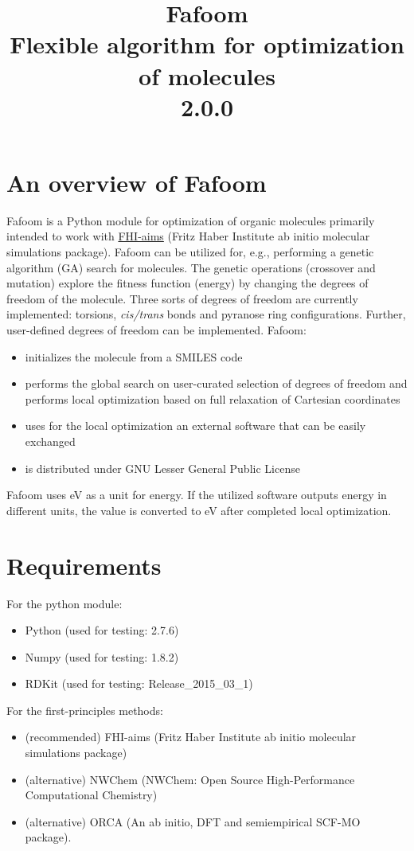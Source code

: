 \documentclass[a4paper]{article}
\title{\textbf{Fafoom}\\Flexible algorithm for optimization of molecules \\ 2.0.0}
\begin{document}
\maketitle

\tableofcontents
\newpage

\section{An overview of Fafoom}

Fafoom is a Python module for optimization of organic molecules primarily intended to work with \href{https://doi.org/10.1021/acs.jcim.5b00243}{FHI-aims} (Fritz Haber Institute ab initio molecular simulations package). 
Fafoom can be utilized for, e.g., performing  a genetic algorithm (GA) search for molecules. The genetic operations (crossover and mutation) explore the fitness function (energy) by changing the degrees of freedom of the molecule. Three sorts of degrees of freedom are currently implemented: torsions, \textit{cis/trans} bonds and pyranose ring configurations. Further, user-defined degrees of freedom can be implemented. Fafoom:
\begin{itemize}
\item initializes the molecule from a SMILES code
\item performs the global search on user-curated selection of degrees of freedom and performs local optimization based on full relaxation of Cartesian coordinates
\item uses for the local optimization an external software that can be easily exchanged
\item is distributed under GNU Lesser General Public License 
\end{itemize}

Fafoom uses eV as a unit for energy. If the utilized software outputs energy in different units, the value is converted to eV after completed local optimization.

\section{Requirements}

For the python module:
\begin{itemize}
\item Python (used for testing: 2.7.6)
\item Numpy (used for testing: 1.8.2)
\item RDKit (used for testing: Release\_2015\_03\_1)
\end{itemize} 
For the first-principles methods:
\begin{itemize}
\item (recommended) FHI-aims (Fritz Haber Institute ab initio molecular simulations package)
\item (alternative) NWChem (NWChem: Open Source High-Performance Computational Chemistry)
\item (alternative) ORCA (An ab initio, DFT and semiempirical SCF-MO package). 

\end{itemize} 
\end{document}
